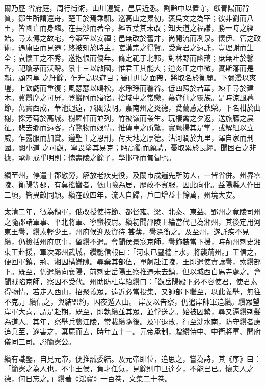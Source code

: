 \begin{pinyinscope}
 爾乃歷
 省府庭，周行街術，山川遠覽，邑居近悉。割黔中以置守，獻青陽而背質，鄒生所謂還舟，楚王於焉乘馹。巡高山之累仞，褒吳文之為宰；彼非劉而八王，皆國亡而身醢。在長沙而著令，經五葉其未改；知天道之福謙，勝一時之經始。尋太傅之故宅，今築室以安禪；邑無改於舊井，尚開流而冽泉。懷伊、管之政術，遇庸臣而見遷；終被知於時主，嗟漢宗之得賢。受齊君之遠託，豈理謝而生全；哀懷王之不秀，遂抱恨而傷年。脩定祀于北郭，對林野而幽藹；庶無吐於馨香，祀瓊茅而沃酹。景十三以啟國，惟君王其能大；迨炎正之中微，實斯籓而是賴。顧四阜
 之紆餘，乍升高以遊目；審山川之面帶，將取名於衡麓。下彌漫以爽塏，上欽虧而重復；風瑟瑟以鳴松，水琤琤而響谷。低四照於若華，竦千尋於建木。冀囂塵之可屏，登巖阿而寤宿。捨域中之常戀，慕遊仙之靈族。是時涼風暮節，萬實西成，華池迥遠，飛閣淒明。嘉南州之炎德，愛蘭蕙之秋榮。下名柑於曲榭，採芳菊於高城。樹羅軒而並列，竹被嶺而叢生。玩棲禽之夕返，送旅鴈之晨征。悲去鄉而遠客，寄覽物而娛情。惟傳車之所騖，實鷹揚其是掌，或解組以立威，乍露服而加賞。遵聖主之恩刑，荷天地之厚德。沾河潤於九里，澤自家而刑國。闕小道
 之可觀，寧畏塗其易克；眄高衢而願騁，憂取累於長纆。聞困石之非據，承炯戒乎明則；愧壽陵之餘子，學邯鄲而匍匐也。



 纘至州，停遣十郡慰勞，解放老疾吏役，及關市戍邏先所防人，一皆省併。州界零陵、衡陽等郡，有莫徭蠻者，依山險為居，歷政不賓服，因此向化。益陽縣人作田二頃，皆異畝同穎。纘在政四年，流人自歸，戶口增益十餘萬，州境大安。



 太清二年，徵為領軍，俄改授使持節、都督雍、梁、北秦、東益、郢州之竟陵司州之隨郡諸軍事、平北將軍、寧蠻校尉。纘初聞邵陵王綸當代己為湘州，其後定用河東王譽，纘素輕少王，州府候迎及資待
 甚薄，譽深銜之。及至州，遂託疾不見纘，仍檢括州府庶事，留纘不遣。會聞侯景寇京師，譽飾裝當下援，時荊州刺史湘東王赴援，軍次郢州武城，纘馳信報曰：「河東已豎檣上水，將襲荊州。」王信之，便回軍鎮，荊、湘因構嫌隙。尋棄其部伍，單舸赴江陵，王即遣使責讓譽，索纘部下。既至，仍遣纘向襄陽，前刺史岳陽王察推遷未去鎮，但以城西白馬寺處之。會聞賊陷京師，察因不受代。州助防杜岸紿纘曰：「觀岳陽殿下必不容使君，使君素得物情，若走入西山，招聚義眾，遠近必當投集，又帥部下繼至，以此義舉，無往不克。」纘信之，與結盟約，因夜遁入山。
 岸反以告察，仍遣岸帥軍追纘。纘眾望岸軍大喜，謂是赴期，既至，即執纘並其眾，並俘送之。始被囚縶，尋又逼纘剃髮為道人。其年，察舉兵襲江陵，常載纘隨後。及軍退敗，行至湕水南，防守纘者慮追兵至，遂害之，棄屍而去，時年五十一。元帝承制，贈纘侍中、中衛將軍、開府儀同三司。謚簡憲公。



 纘有識鑒，自見元帝，便推誠委結。及元帝即位，追思之，嘗為詩，其《序》曰：「簡憲之為人也，不事王侯，負才任氣，見餘則申旦達夕，不能已已。懷夫人之德，何日忘之。」纘著《鴻寶》一百卷，文集二十卷。




\end{pinyinscope}
